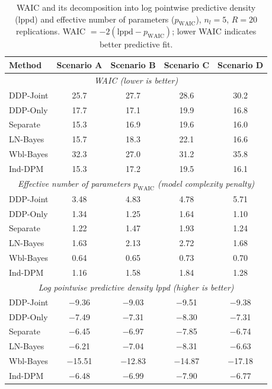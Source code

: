 \documentclass[a4paper,fleqn,longmktitle]{cas-sc}
\begin{document}
\begin{table}
\centering
\caption{WAIC and its decomposition into log pointwise predictive density (lppd) and effective number of parameters ($p_{\mathrm{WAIC}}$), $n_l = 5$, $R = 20$ replications. WAIC $= -2(\text{lppd} - p_{\mathrm{WAIC}})$; lower WAIC indicates better predictive fit.}
\label{tab:sim_waic}
\begin{tabular}{lcccc}
\toprule
Method & Scenario A & Scenario B & Scenario C & Scenario D \\
\midrule
\multicolumn{5}{c}{\textit{WAIC (lower is better)}} \\
\midrule
DDP-Joint & 25.7 & 27.7 & 28.6 & 30.2 \\
DDP-Only  & 17.7 & 17.1 & 19.9 & 16.8 \\
Separate  & 15.3 & 16.9 & 19.6 & 16.0 \\
LN-Bayes   & 15.7 & 18.3 & 22.1 & 16.6 \\
Wbl-Bayes  & 32.3 & 27.0 & 31.2 & 35.8 \\
Ind-DPM    & 15.3 & 17.2 & 19.5 & 16.1 \\
\midrule
\multicolumn{5}{c}{\textit{Effective number of parameters $p_{\mathrm{WAIC}}$ (model complexity penalty)}} \\
\midrule
DDP-Joint & 3.48 & 4.83 & 4.78 & 5.71 \\
DDP-Only  & 1.34 & 1.25 & 1.64 & 1.10 \\
Separate  & 1.22 & 1.47 & 1.93 & 1.24 \\
LN-Bayes   & 1.63 & 2.13 & 2.72 & 1.68 \\
Wbl-Bayes  & 0.64 & 0.65 & 0.73 & 0.70 \\
Ind-DPM    & 1.16 & 1.58 & 1.84 & 1.28 \\
\midrule
\multicolumn{5}{c}{\textit{Log pointwise predictive density lppd (higher is better)}} \\
\midrule
DDP-Joint & $-$9.36 & $-$9.03 & $-$9.51 & $-$9.38 \\
DDP-Only  & $-$7.49 & $-$7.31 & $-$8.30 & $-$7.31 \\
Separate  & $-$6.45 & $-$6.97 & $-$7.85 & $-$6.74 \\
LN-Bayes   & $-$6.21 & $-$7.04 & $-$8.31 & $-$6.63 \\
Wbl-Bayes  & $-$15.51 & $-$12.83 & $-$14.87 & $-$17.18 \\
Ind-DPM    & $-$6.48 & $-$6.99 & $-$7.90 & $-$6.77 \\
\bottomrule

\end{tabular}
\end{table}
\end{document}
